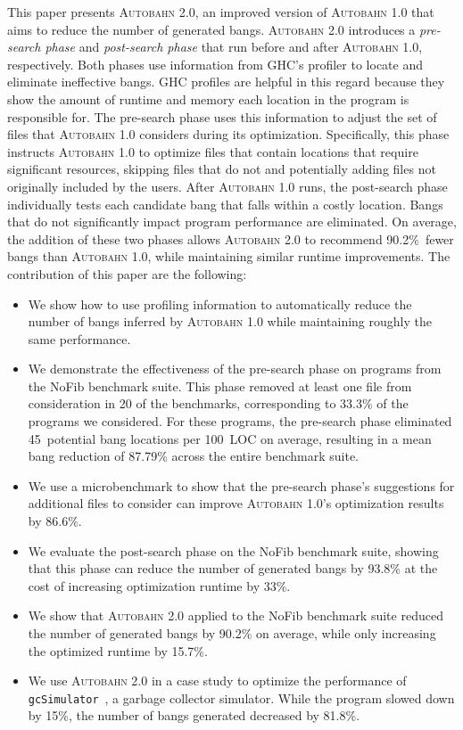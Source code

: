 \documentclass[format=sigplan, review=true]{acmart}
\newcommand{\SHOWCOMMENT}[1]{\ifdraft #1 \fi}
\newcommand{\ksf}[1]{\SHOWCOMMENT{{\color{tuftsblue} [K: #1]}}}
\newcommand{\acut}[1]{}
\newcommand{\Ao}[0]{\textsc{Autobahn 1.0}}
\newcommand{\At}[0]{\textsc{Autobahn 2.0}}
\newcommand{\preopt}[0]{pre-search}
\newcommand{\postopt}[0]{post-search}
\begin{document}
This paper presents \At{}, an improved version of \Ao{} that aims
to reduce the number of generated bangs. 
\At{} introduces a \textit{\preopt{} phase} and
\textit{\postopt{} phase} that run before and after \Ao{},
respectively.  Both phases use information from GHC's profiler to
locate and eliminate ineffective bangs. 
GHC profiles are helpful in this regard because they
show the amount of runtime and memory each location in the
program is responsible for. The \preopt{} phase uses this information to adjust the set of files that
\Ao{} considers during its optimization.
Specifically, this phase instructs \Ao{} to
optimize files that contain locations that require significant
resources, skipping files that do not and
potentially adding files not originally included by the users.
After \Ao{} runs, the \postopt{} phase individually tests
each candidate bang that falls within a costly location. Bangs that
do not significantly impact program performance are
eliminated. On average, the addition of these two phases allows \At{}
to recommend 90.2\%~fewer bangs than \Ao{}, while maintaining similar
runtime improvements. The contribution of this paper are the
following:
\ksf{Check that the statistics on this summary are correct.}
\begin{itemize}
  \item We show how to use profiling information to automatically reduce the number
    of bangs inferred by \Ao{} while maintaining roughly the same
    performance. 
  \item We demonstrate the effectiveness of the \preopt{} phase on
    programs from the NoFib benchmark suite.  This phase removed at
    least one file from consideration in 20 of the benchmarks, 
    corresponding to 33.3\% of the programs we considered.
    For these programs, the \preopt{} phase eliminated
    45~potential bang locations per 100~LOC on average, resulting in a mean bang
    reduction of 87.79\% across the entire benchmark suite. 
  \item We use a microbenchmark to show that the \preopt{} phase's
    suggestions for additional files to consider can improve \Ao{}'s
    optimization results by 86.6\%.
  \item We evaluate the \postopt{} phase on the NoFib benchmark suite,
    showing that this phase can reduce the number of generated bangs by 93.8\%
    at the cost of increasing optimization runtime by 33\%.
  \item We show that \At{} applied to the NoFib benchmark suite reduced
    the number of generated bangs by 90.2\% on average, while only increasing the optimized
    runtime by 15.7\%.
  \item We use \At{} in a case study to optimize the performance of 
    \texttt{gcSimulator}~\cite{Ricci13}, a garbage collector simulator. While the
    program slowed down by 15\%, the number of bangs generated
    decreased by 81.8\%.
\acut{
  \item We apply \At{} in a second case study to show that it can
    preserve the application-specific annotations inferred by \Ao{}
    for two different uses of the Aeson~\cite{aeson} library.}
\end{itemize}
\end{document}
